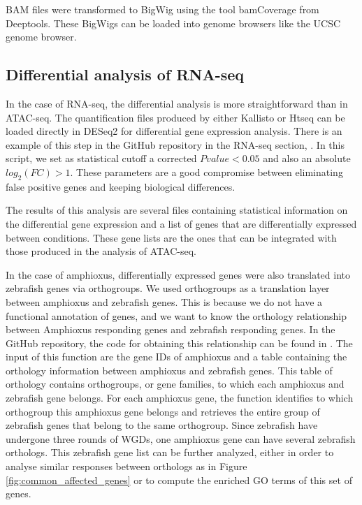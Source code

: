BAM files were transformed to BigWig using the tool bamCoverage from Deeptools. These BigWigs can be loaded into genome browsers like the UCSC genome browser.

\subsection{Differential analysis of RNA-seq}

In the case of RNA-seq, the differential analysis is more straightforward than in ATAC-seq. The quantification files produced by either Kallisto or Htseq can be loaded directly in DESeq2 for differential gene expression analysis. There is an example of this step in the GitHub repository in the RNA-seq section, . In this script, we set as statistical cutoff a corrected $P value < 0.05$ and also an absolute $log_2(FC) > 1$. These parameters are a good compromise between eliminating false positive genes and keeping biological differences. 

The results of this analysis are several files containing statistical information on the differential gene expression and a list of genes that are differentially expressed between conditions. These gene lists are the ones that can be integrated with those produced in the analysis of ATAC-seq. 

In the case of amphioxus, differentially expressed genes were also translated into zebrafish genes via orthogroups. We used orthogroups as a translation layer between amphioxus and zebrafish genes. This is because we do not have a functional annotation of genes, and we want to know the orthology relationship between Amphioxus responding genes and zebrafish responding genes. In the GitHub repository, the code for obtaining this relationship can be found in . The input of this function are the  gene IDs of amphioxus and a table containing the orthology information between amphioxus and zebrafish genes. This table of orthology contains orthogroups, or gene families, to which each amphioxus and zebrafish gene belongs. For each amphioxus gene, the function identifies to which orthogroup this amphioxus gene belongs and retrieves the entire group of zebrafish genes that belong to the same orthogroup. Since zebrafish have undergone three rounds of WGDs, one amphioxus gene can have several zebrafish orthologs. This zebrafish gene list can be further analyzed, either in order to analyse similar responses between orthologs as in Figure \ref{fig:common_affected_genes} or to compute the enriched GO terms of this set of genes.

